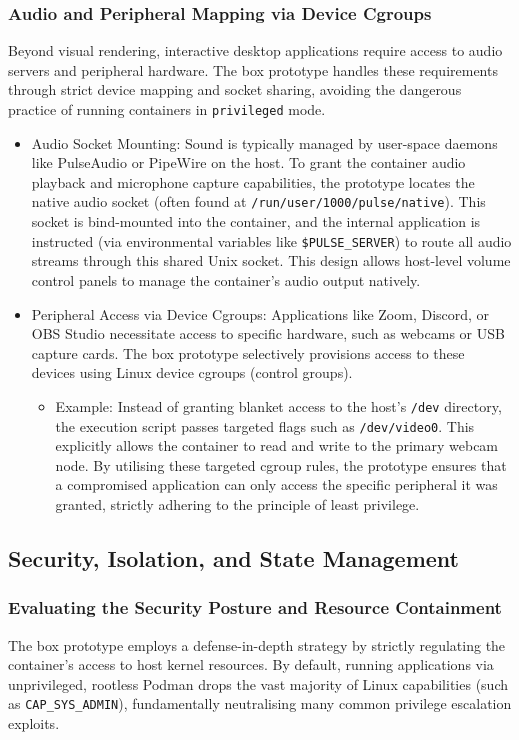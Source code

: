 \documentclass[journal,onecolumn]{IEEEtran}
\newcommand{\code}[1]{\texttt{#1}}
\begin{document}
\subsubsection{Audio and Peripheral Mapping via Device Cgroups}
Beyond visual rendering, interactive desktop applications require access to audio servers and peripheral hardware. The box prototype handles these requirements through strict device mapping and socket sharing, avoiding the dangerous practice of running containers in \code{privileged} mode.
\begin{itemize}
    \item Audio Socket Mounting: Sound is typically managed by user-space daemons like PulseAudio or PipeWire on the host. To grant the container audio playback and microphone capture capabilities, the prototype locates the native audio socket (often found at \code{/run/user/1000/pulse/native}). This socket is bind-mounted into the container, and the internal application is instructed (via environmental variables like \code{\$PULSE\_SERVER}) to route all audio streams through this shared Unix socket. This design allows host-level volume control panels to manage the container's audio output natively.
    
    \item Peripheral Access via Device Cgroups: Applications like Zoom, Discord, or OBS Studio necessitate access to specific hardware, such as webcams or USB capture cards. The box prototype selectively provisions access to these devices using Linux device cgroups (control groups).
    \begin{itemize}
        \item Example: Instead of granting blanket access to the host's \code{/dev} directory, the execution script passes targeted flags such as \code{/dev/video0}. This explicitly allows the container to read and write to the primary webcam node. By utilising these targeted cgroup rules, the prototype ensures that a compromised application can only access the specific peripheral it was granted, strictly adhering to the principle of least privilege.
    \end{itemize}
\end{itemize}

\subsection{Security, Isolation, and State Management}
\subsubsection{Evaluating the Security Posture and Resource Containment}
The box prototype employs a defense-in-depth strategy by strictly regulating the container's access to host kernel resources. By default, running applications via unprivileged, rootless Podman drops the vast majority of Linux capabilities (such as \code{CAP\_SYS\_ADMIN}), fundamentally neutralising many common privilege escalation exploits.
\end{document}
